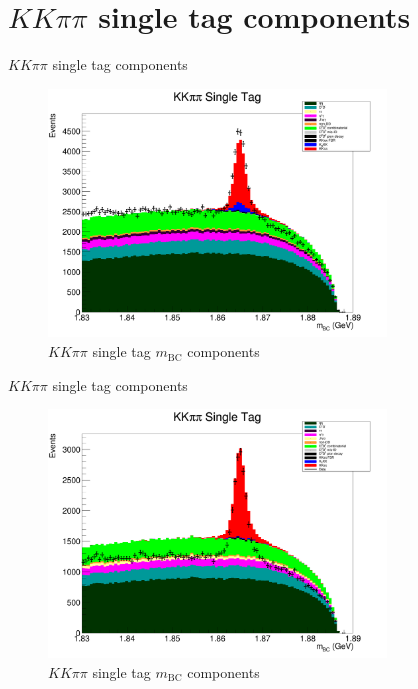 \documentclass{beamer}
\begin{document}
\section{$KK\pi\pi$ single tag components}
\begin{frame}{$KK\pi\pi$ single tag components}
  \begin{figure}
    \centering
    \includegraphics[width=0.8\textwidth]{MCPlusDataOld.png}
    \caption{$KK\pi\pi$ single tag $m_\text{BC}$ components}
  \end{figure}
\end{frame}

\begin{frame}{$KK\pi\pi$ single tag components}
  \begin{figure}
    \centering
    \includegraphics[width=0.8\textwidth]{MCPlusData.png}
    \caption{$KK\pi\pi$ single tag $m_\text{BC}$ components}
  \end{figure}
\end{frame}
\end{document}
